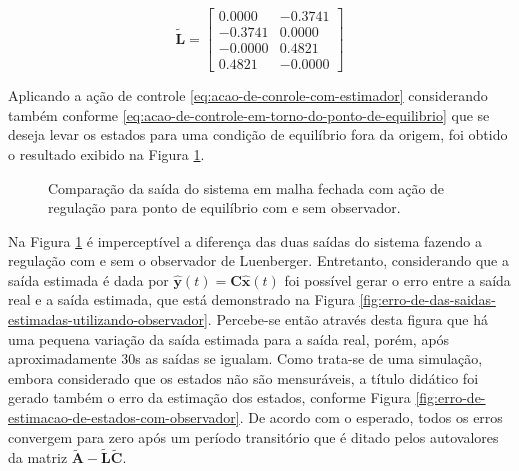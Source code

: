 \begin{equation}
    \label{eq:matriz-de-ganhos-do-estimador}
    \mathbf{\tilde{L}} =
    \begin{bmatrix}
        0.0000  & -0.3741   \\
        -0.3741 & 0.0000    \\
        -0.0000 & 0.4821    \\
        0.4821  & -0.0000
    \end{bmatrix}
\end{equation}

Aplicando a ação de controle \ref{eq:acao-de-conrole-com-estimador} considerando
também conforme \ref{eq:acao-de-controle-em-torno-do-ponto-de-equilibrio} que se
deseja levar os estados para uma condição de equilíbrio fora da origem, foi
obtido o resultado exibido na Figura
\ref{fig:erro-de-estimacao-de-estados-do-regulador-com-observador}.

\begin{figure}[!ht]
    \caption{Comparação da saída do sistema em malha fechada com ação de
    regulação para ponto de equilíbrio com e sem observador.}
    \hspace{-30pt}
    \label{fig:erro-de-estimacao-de-estados-do-regulador-com-observador}
    \begin{minipage}{\linewidth}
        
    \end{minipage}
\end{figure}

Na Figura \ref{fig:erro-de-estimacao-de-estados-do-regulador-com-observador} é
imperceptível a diferença das duas saídas do sistema fazendo a regulação com e
sem o observador de Luenberger. Entretanto, considerando que a saída estimada é
dada por $\mathbf{\hat{y}}(t) = \mathbf{C}\mathbf{\hat{x}}(t)$ foi possível
gerar o erro entre a saída real e a saída estimada, que está demonstrado na
Figura \ref{fig:erro-de-das-saidas-estimadas-utilizando-observador}. Percebe-se
então através desta figura que há uma pequena variação da saída estimada para a
saída real, porém, após aproximadamente 30s as saídas se igualam. Como trata-se
de uma simulação, embora considerado que os estados não são mensuráveis, a
título didático foi gerado também o erro da estimação dos estados, conforme
Figura \ref{fig:erro-de-estimacao-de-estados-com-observador}. De acordo com o
esperado, todos os erros convergem para zero após um período transitório que é
ditado pelos autovalores da matriz
$\mathbf{\tilde{A}}-\mathbf{\tilde{L}}\mathbf{\tilde{C}}$.

